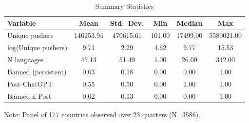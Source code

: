 \begin{table}[htbp]
\centering
\caption{Summary Statistics}
\label{tab:summary}
\begin{tabular}{lccccc}
\toprule
Variable & Mean & Std.\ Dev. & Min & Median & Max \\
\midrule
Unique pushers & 146253.94 & 470615.61 & 101.00 & 17499.00 & 5580021.00 \\
log(Unique pushers) & 9.71 & 2.29 & 4.62 & 9.77 & 15.53 \\
N languages & 45.13 & 51.49 & 1.00 & 26.00 & 342.00 \\
Banned (persistent) & 0.03 & 0.18 & 0.00 & 0.00 & 1.00 \\
Post-ChatGPT & 0.55 & 0.50 & 0.00 & 1.00 & 1.00 \\
Banned x Post & 0.02 & 0.13 & 0.00 & 0.00 & 1.00 \\
\bottomrule
\end{tabular}
\begin{tablenotes}
\small
\item Note: Panel of 177 countries observed over 23 quarters (N=3586).
\end{tablenotes}
\end{table}